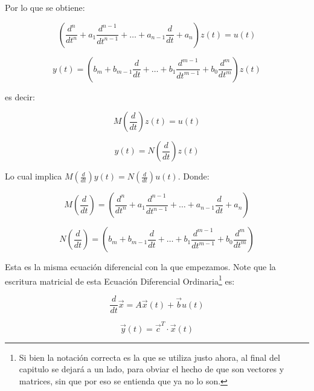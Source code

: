     Por lo que se obtiene:

    \begin{equation*}
        \left( \frac{d^n}{dt^n} + a_1 \frac{d^{n-1}}{dt^{n-1}} + \dots + a_{n-1} \frac{d}{dt} + a_n \right) z(t) = u(t)
    \end{equation*}

    \begin{equation*}
        y(t) = \left( b_m + b_{m-1} \frac{d}{dt} + \dots + b_1 \frac{d^{m-1}}{dt^{m-1}} + b_0 \frac{d^m}{dt^m} \right) z(t)
    \end{equation*}

    es decir:

    \begin{equation}
        M \left( \frac{d}{dt} \right) z(t) = u(t)
    \end{equation}

    \begin{equation}
        y(t) = N \left( \frac{d}{dt} \right) z(t)
    \end{equation}

    Lo cual implica $M \left( \frac{d}{dt} \right) y(t) = N \left( \frac{d}{dt} \right) u(t)$. Donde:

    \begin{equation*}
        M \left( \frac{d}{dt} \right) = \left( \frac{d^n}{dt^n} + a_1 \frac{d^{n-1}}{dt^{n-1}} + \dots + a_{n-1} \frac{d}{dt} + a_n \right)
    \end{equation*}

    \begin{equation*}
        N \left( \frac{d}{dt} \right) = \left( b_m + b_{m-1} \frac{d}{dt} + \dots + b_1 \frac{d^{m-1}}{dt^{m-1}} + b_0 \frac{d^m}{dt^m} \right)
    \end{equation*}

    Esta es la misma ecuación diferencial con la que empezamos. Note que la escritura matricial de esta Ecuación Diferencial Ordinaria\footnote{Si bien la notación correcta es la que se utiliza justo ahora, al final del capitulo se dejará a un lado, para obviar el hecho de que son vectores y matrices, sin que por eso se entienda que ya no lo son.} es:

    \begin{equation}
        \frac{d}{dt} \vec{x} = A \vec{x}(t) + \vec{b} u(t)
    \end{equation}

    \begin{equation}
        \vec{y}(t) = \vec{c}^{T} \cdot \vec{x}(t)
    \end{equation}

